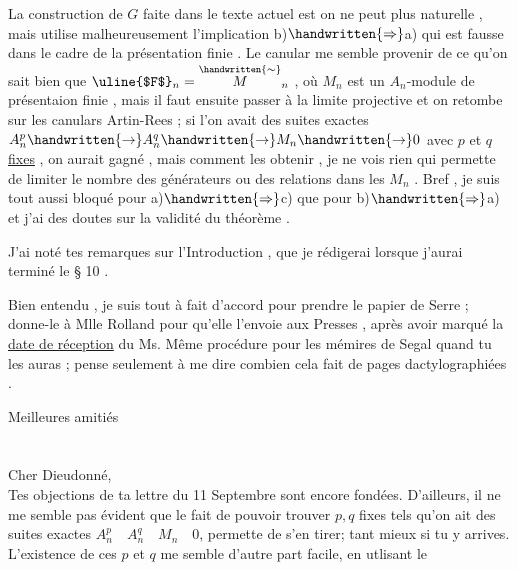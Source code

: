 La construction de \uline{$G$} faite dans le texte actuel est on ne peut plus naturelle , mais utilise malheureusement l'implication b)$\handwritten{\Rightarrow}$a) qui est fausse dans le cadre de la présentation finie . Le canular me semble provenir de ce qu'on sait bien que $\text{\uline{$F$}}_n=\overset{\handwritten{\sim}}{M}_n$ , où $M_n$ est un $A_n$-module de présentaion finie , mais il faut ensuite passer à la limite projective \reversemarginpar{}\normalmarginpar et on retombe sur les canulars Artin-Rees ; si l'on avait des suites exactes $A_n^p\handwritten{\to}A_n^q\handwritten{\to}M_n\handwritten{\to}0$ avec $p$ et $q$ \uline{fixes} , on aurait gagné , mais comment les obtenir , je ne vois rien qui permette de limiter le nombre des générateurs ou des relations dans les $M_n$ . Bref , je suis tout aussi bloqué pour  a)$\handwritten{\Rightarrow}$c) que pour b)$\handwritten{\Rightarrow}$a) et j'ai des doutes sur la validité du théorème .

J'ai noté tes remarques sur l'Introduction , que je rédigerai lorsque j'aurai terminé le § 10 .

Bien entendu , je suis tout à fait d'accord pour prendre le papier de Serre ; donne-le à Mlle Rolland pour qu'elle l'envoie aux Presses , après avoir marqué la \uline{date de réception} du Ms. Même procédure \reversemarginpar{}\normalmarginpar pour les mémires de Segal quand tu les auras ; pense seulement à me dire combien cela fait de pages dactylographiées .

Meilleures amitiés\\
\\

\\

Cher Dieudonné,\\

Tes objections de ta lettre du 11 Septembre sont encore fondées. D'ailleurs, il ne me semble pas évident que le fait de pouvoir trouver $p,q$ fixes tels qu'on ait des suites exactes $A_n^p\quad A_n^q\quad M_n\quad0$, permette de s'en tirer; tant mieux si tu y arrives. L'existence de ces $p$ et $q$ me semble d'autre part facile, en utlisant le

